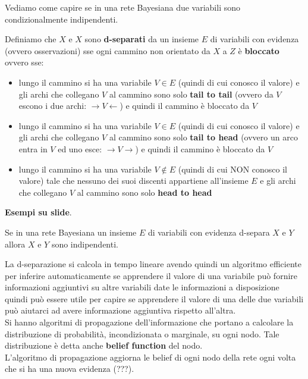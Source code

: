 \message{ !name(modprob.tex)}\documentclass[a4paper,12pt, oneside]{book}
\begin{document}
Vediamo come capire se in una rete Bayesiana due variabili sono condizionalmente
indipendenti.
\begin{definizione}
  Definiamo che $X$ e $X$ sono \textbf{d-separati} da un insieme $E$ di
  variabili con evidenza (ovvero osservazioni) sse ogni cammino non orientato da
  $X$ a $Z$ è \textbf{bloccato} ovvero sse:
  \begin{itemize}
    \item lungo il cammino si ha una variabile $V\in E$ (quindi di cui conosco
    il valore) e gli archi che
    collegano $V$ al cammino sono solo \textbf{tail to tail} (ovvero da $V$
    escono i 
    due archi: $\to V\gets$) e quindi il cammino è bloccato da $V$
    \item lungo il cammino si ha una variabile $V\in E$ (quindi di cui conosco
    il valore) e gli archi che
    collegano $V$ al cammino sono solo \textbf{tail to head} (ovvero un arco
    entra in 
    $V$ ed uno esce: $\to V\to$) e quindi il cammino è bloccato da $V$
    \item lungo il cammino si ha una variabile $V\not\in E$ (quindi di cui NON
    conosco il valore) tale che nessuno dei
    suoi discenti appartiene all'insieme $E$ e gli archi che
    collegano $V$ al cammino sono solo \textbf{head to head}
  \end{itemize}
\end{definizione}
\textbf{Esempi su slide}.\\
\begin{teorema}
  Se in una rete Bayesiana un insieme $E$ di variabili con evidenza d-separa $X$
  e $Y$ allora $X$ e $Y$ sono indipendenti.
\end{teorema}
La d-separazione si calcola in tempo lineare avendo quindi un algoritmo
efficiente per inferire automaticamente se apprendere il valore di una variabile
può fornire informazioni aggiuntivi su altre variabili date le informazioni a
disposizione quindi può essere utile per capire se apprendere il valore di una
delle due variabili può aiutarci ad avere informazione aggiuntiva rispetto
all’altra.\\ 
Si hanno algoritmi di propagazione dell'informazione che portano a calcolare la
distribuzione di probabilità, incondizionata o marginale, su ogni nodo. Tale
distribuzione è detta anche \textbf{belief function} del nodo. \\
L'algoritmo di propagazione aggiorna le belief di ogni nodo della rete ogni
volta che si ha una nuova evidenza (???).\\
\end{document}
